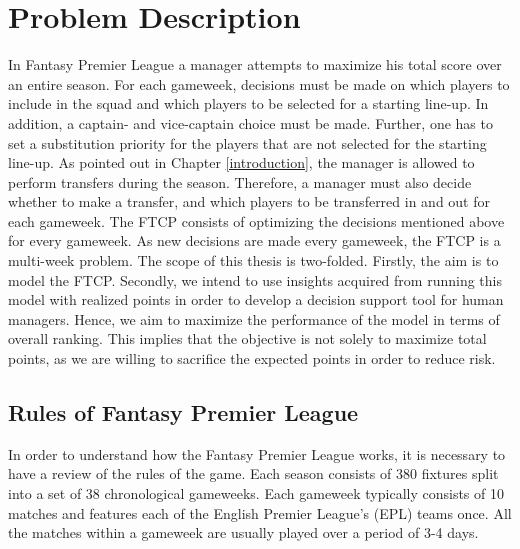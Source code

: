 
\chapter{Problem Description}
In Fantasy Premier League a manager attempts to maximize his total score over an entire season. For each gameweek, decisions must be made on which players to include in the squad and which players to be selected for a starting line-up. In addition, a captain- and vice-captain choice must be made. Further, one has to set a substitution priority for the players that are not selected for the starting line-up. As pointed out in Chapter \ref{introduction}, the manager is allowed to perform transfers during the season. Therefore, a manager must also decide whether to make a transfer, and which players to be transferred in and out for each gameweek.
\newpar
The FTCP consists of optimizing the decisions mentioned above for every gameweek. As new decisions are made every gameweek, the FTCP is a multi-week problem. The scope of this thesis is two-folded. Firstly, the aim is to model the FTCP. Secondly, we intend to use insights acquired from running this model with realized points in order to develop a decision support tool for human managers. Hence, we aim to maximize the performance of the model in terms of overall ranking. This implies that the objective is not solely to maximize total points, as we are willing to sacrifice the expected points in order to reduce risk. 

\section{Rules of Fantasy Premier League} \label{rules of fpl}

In order to understand how the Fantasy Premier League works, it is necessary to have a review of the rules of the game. Each season consists of 380 fixtures split into a set of 38 chronological gameweeks. Each gameweek typically consists of 10 matches and features each of the English Premier League's (EPL) teams once. All the matches within a gameweek are usually played over a period of 3-4 days.


